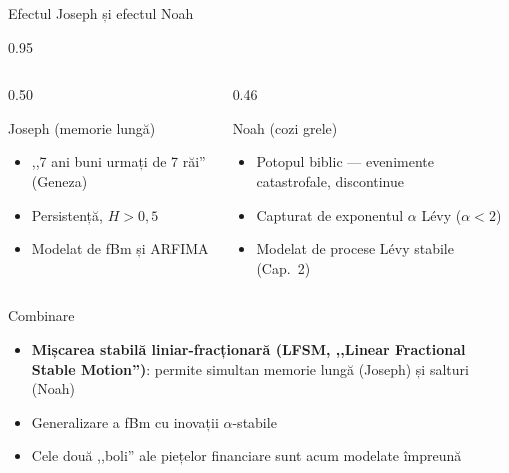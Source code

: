 \documentclass[9pt, aspectratio=169, t]{beamer}
\begin{document}
\begin{frame}[shrink=15]{Efectul Joseph și efectul Noah}
\begin{cminipage}{0.95\textwidth}
\begin{columns}[T]
\begin{column}{0.50\textwidth}
\begin{block}{Joseph (memorie lungă)}
\begin{itemize}\setlength{\itemsep}{0pt}
    \item ,,7 ani buni urmați de 7 răi'' (Geneza)
    \item Persistență, $H>0{,}5$
    \item Modelat de fBm și ARFIMA
\end{itemize}
\end{block}
\end{column}
\begin{column}{0.46\textwidth}
\begin{alertblock}{Noah (cozi grele)}
\begin{itemize}\setlength{\itemsep}{0pt}
    \item Potopul biblic --- evenimente catastrofale, discontinue
    \item Capturat de exponentul $\alpha$ Lévy ($\alpha<2$)
    \item Modelat de procese Lévy stabile (Cap.~2)
\end{itemize}
\end{alertblock}
\end{column}
\end{columns}
\vspace{0.2cm}
\begin{exampleblock}{Combinare}
\begin{itemize}\setlength{\itemsep}{0pt}
    \item \textbf{Mișcarea stabilă liniar-fracționară (LFSM, ,,Linear Fractional Stable Motion'')}: permite simultan memorie lungă (Joseph) și salturi (Noah)
    \item Generalizare a fBm cu inovații $\alpha$-stabile
    \item Cele două ,,boli'' ale piețelor financiare sunt acum modelate împreună
\end{itemize}
\end{exampleblock}
\end{cminipage}
\end{frame}
\end{document}
